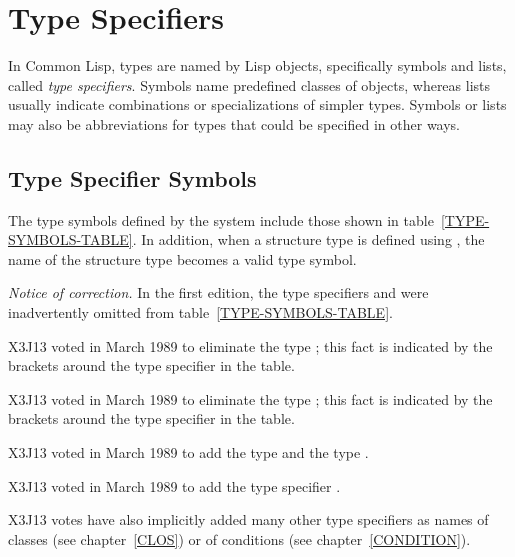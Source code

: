 
\clearpage\def\pagestatus{FINAL PROOF}

\ifx \rulang\Undef

\chapter{Type Specifiers}    %
\label{DTSPEC}

In Common Lisp, types are named by Lisp objects, specifically symbols and lists,
called \emph{type specifiers}.  Symbols name predefined classes of objects,
whereas lists usually indicate combinations or
specializations of simpler types.
Symbols or lists may also be abbreviations for types that could
be specified in other ways.

\section{Type Specifier Symbols}

The type symbols defined by the system include those shown in
table~\ref{TYPE-SYMBOLS-TABLE}.
In addition, when a structure type is defined using ,
the name of the structure type becomes a valid type symbol.

\begin{new}%
\emph{Notice of correction.}
In the first edition, the type specifiers  and
 were inadvertently omitted from
table~\ref{TYPE-SYMBOLS-TABLE}.
\end{new}

\begin{newer}
X3J13 voted in March 1989 
to eliminate the type ; this fact is indicated by the brackets around
the  type specifier in the table.

X3J13 voted in March 1989 
to eliminate the type ;
this fact is indicated by the brackets around
the  type specifier in the table.

X3J13 voted in March 1989 
to add the type  and the type .

X3J13 voted in March 1989 
to add the type specifier .

X3J13 votes have also implicitly added
many other type specifiers as names of classes (see chapter~\ref{CLOS})
or of conditions (see chapter~\ref{CONDITION}).
\end{newer}

